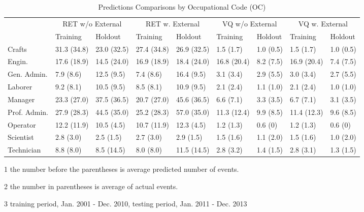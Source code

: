 \begin{table}[h!]
	\centering
	\scriptsize
	\renewcommand{\arraystretch}{1.2}
	\caption{Predictions Comparisons by Occupational Code (OC)}
	\begin{threeparttable}
		\begin{tabular}{lllllllll}
			\toprule
			& \multicolumn{2}{c}{RET w/o External} & \multicolumn{2}{c}{RET w. External} & \multicolumn{2}{c}{VQ w/o External} & \multicolumn{2}{c}{VQ w. External} \\  \cline{2-9}
			& Training & Holdout & Training & Holdout & Training & Holdout & Training & Holdout \\ \midrule
			Crafts  & 31.3\tnote{1} (34.8)\tnote{2} & 23.0 (32.5) & 27.4 (34.8) & 26.9 (32.5) & 1.5 (1.7) & 1.0 (0.5) & 1.5 (1.7) & 1.0 (0.5) \\
			Engin.    & 17.6 (18.9) & 14.5 (24.0) & 16.9 (18.9) & 18.4 (24.0) & 16.8 (20.4) & 8.2 (7.5) & 16.9 (20.4) & 7.4 (7.5) \\
			Gen. Admin. & 7.9 (8.6) & 12.5 (9.5) & 7.4 (8.6) & 16.4 (9.5) & 3.1 (3.4) & 2.9 (5.5) & 3.0 (3.4) & 2.7 (5.5) \\
			Laborer     & 9.2 (8.1) & 10.5 (9.5) & 8.5 (8.1) & 10.9 (9.5) & 2.1 (2.4) & 1.1 (1.0) & 2.1 (2.4) & 1.0 (1.0) \\
			Manager     & 23.3 (27.0) & 37.5 (36.5) & 20.7 (27.0) & 45.6 (36.5) & 6.6 (7.1) & 3.3 (3.5) & 6.7 (7.1) & 3.1 (3.5) \\
			Prof. Admin.     & 27.9 (28.3) & 44.5 (35.0) & 25.2 (28.3) & 57.0 (35.0) & 11.3 (12.4) & 9.9 (8.5) & 11.4 (12.3) & 9.6 (8.5) \\
			Operator     & 12.2 (11.9) & 10.5 (4.5) & 10.7 (11.9) & 12.3 (4.5) & 1.2 (1.3) & 0.6 (0) & 1.2 (1.3) & 0.6 (0) \\
			Scientist     & 2.8 (3.0) & 2.5 (1.5) & 2.7 (3.0) & 2.9 (1.5) & 1.5 (1.6) & 1.1 (2.0) & 1.5 (1.6) & 1.0 (2.0) \\
			Technician     & 8.8 (8.0) & 8.5 (14.5) & 8.0 (8.0) & 11.5 (14.5) & 2.8 (3.2) & 1.4 (1.5) & 2.8 (3.1) & 1.3 (1.5) \\
			\bottomrule
		\end{tabular}%
	\begin{tablenotes}
		\item[1] the number before the parentheses is average predicted number of events.
		\item[2] the number in parentheses is average of actual events.
		\item[3] training period, Jan. 2001 - Dec. 2010, testing period, Jan. 2011 - Dec. 2013
	\end{tablenotes}
		\end{threeparttable}
		\label{tab:cocscode}
	\end{table}
	
